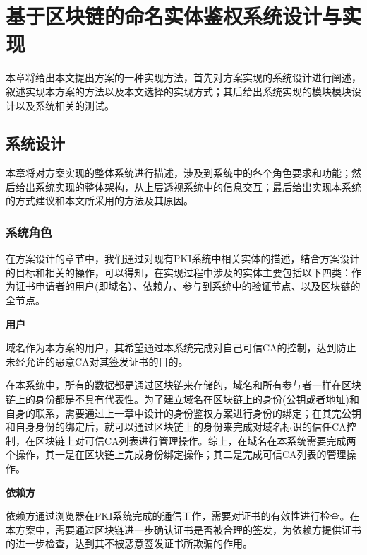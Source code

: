 
\chapter{基于区块链的命名实体鉴权系统设计与实现}

本章将给出本文提出方案的一种实现方法，首先对方案实现的系统设计进行阐述，叙述实现本方案的方法以及本文选择的实现方式；其后给出系统实现的模块模块设计以及系统相关的测试。

\section{系统设计}

本章将对方案实现的整体系统进行描述，涉及到系统中的各个角色要求和功能；然后给出系统实现的整体架构，从上层透视系统中的信息交互；最后给出实现本系统的方式建议和本文所采用的方法及其原因。

\subsection{系统角色}


在方案设计的章节中，我们通过对现有PKI系统中相关实体的描述，结合方案设计的目标和相关的操作，可以得知，在实现过程中涉及的实体主要包括以下四类：作为证书申请者的用户(即域名）、依赖方、参与到系统中的验证节点、以及区块链的全节点。


\noindent\textbf{用户}

域名作为本方案的用户，其希望通过本系统完成对自己可信CA的控制，达到防止未经允许的恶意CA对其签发证书的目的。

在本系统中，所有的数据都是通过区块链来存储的，域名和所有参与者一样在区块链上的身份都是不具有代表性。为了建立域名在区块链上的身份(公钥或者地址)和自身的联系，需要通过上一章中设计的身份鉴权方案进行身份的绑定；在其完公钥和自身身份的绑定后，就可以通过区块链上的身份来完成对域名标识的信任CA控制，在区块链上对可信CA列表进行管理操作。综上，在域名在本系统需要完成两个操作，其一是在区块链上完成身份绑定操作；其二是完成可信CA列表的管理操作。


\noindent\textbf{依赖方}

依赖方通过浏览器在PKI系统完成的通信工作，需要对证书的有效性进行检查。在本方案中，需要通过区块链进一步确认证书是否被合理的签发，为依赖方提供证书的进一步检查，达到其不被恶意签发证书所欺骗的作用。

